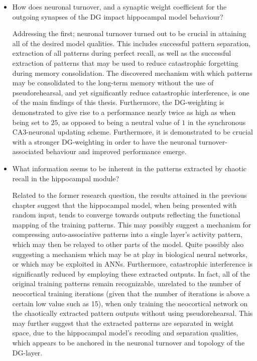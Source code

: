 \begin{itemize}
    \item How does neuronal turnover, and a synaptic weight coefficient for the outgoing synapses of the DG impact hippocampal model behaviour?
    
    Addressing the first; neuronal turnover turned out to be crucial in attaining all of the desired model qualities. This includes successful pattern separation, extraction of all patterns during perfect recall, as well as the successful extraction of patterns that may be used to reduce catastrophic forgetting during memory consolidation. The discovered mechanism with which patterns may be consolidated to the long-term memory without the use of pseudorehearsal, and yet significantly reduce catastrophic interference, is one of the main findings of this thesis.
    Furthermore, the DG-weighting is demonstrated to give rise to a performance nearly twice as high as when being set to $25$, as opposed to being a neutral value of $1$ in the synchronous CA3-neuronal updating scheme. Furthermore, it is demonstrated to be crucial with a stronger DG-weighting in order to have the neuronal turnover-associated behaviour and improved performance emerge.
    
    \item What information seems to be inherent in the patterns extracted by chaotic recall in the hippocampal module?
    
    Related to the former research question, the results attained in the previous chapter suggest that the hippocampal model, when being presented with random input, tends to converge towards outputs reflecting the functional mapping of the training patterns. This may possibly suggest a mechanism for compressing auto-associative patterns into a single layer's activity pattern, which may then be relayed to other parts of the model. Quite possibly also suggesting a mechanism which may be at play in biological neural networks, or which may be exploited in ANNs. Furthermore, catastrophic interference is significantly reduced by employing these extracted outputs. In fact, all of the original training patterns remain recognizable, unrelated to the number of neocortical training iterations (given that the number of iterations is above a certain low value such as 15), when only training the neocortical network on the chaotically extracted pattern outputs without using pseudorehearsal. This may further suggest that the extracted patterns are separated in weight space, due to the hippocampal model's recoding and separation qualities, which appears to be anchored in the neuronal turnover and topology of the DG-layer.
    

\end{itemize}
